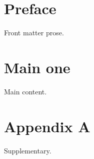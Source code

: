 \documentclass{book}
\begin{document}
\frontmatter
\tableofcontents
\chapter{Preface}
Front matter prose.
\mainmatter
\chapter{Main one}
Main content.
\backmatter
\chapter{Appendix A}
Supplementary.
\end{document}
